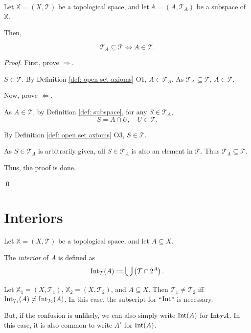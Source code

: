 \begin{proposition}
	Let $\mathbb X = (X, \mathcal T)$ be a topological space, and let $\mathbb A = (A, \mathcal T_A)$ be a subspace of $\mathbb X$.
	
	Then,
	
	$$
	\mathcal T_A \subseteq \mathcal T \iff A \in \mathcal T.
	$$
	
	\begin{proof}
		First, prove $\Rightarrow$.
		
		$S \in \mathcal T$. By Definition \ref{def: open set axioms} O1, $A \in \mathcal T_A$. As $\mathcal T_A \subseteq \mathcal T$, $A \in \mathcal T$.
		
		\qedlm
	
		Now, prove $\Leftarrow$.
		
		As $A \in \mathcal T$, by Definition \ref{def: subspace}, for any $S \in \mathcal T_A$,
		$$
		S = A \cap U, \quad U \in \mathcal T.
		$$
		
		By Definition \ref{def: open set axioms} O3, $S \in \mathcal T$.
		
		As $S \in \mathcal T_A$ is arbitrarily given, all $S \in \mathcal T_A$ is also an element in $\mathcal T$. Thus $\mathcal T_A \subseteq \mathcal T$.
		
		\qedlm
		
		Thus, the proof is done.
		
		\qed
		
	\end{proof}
\end{proposition}


\section{Interiors}


\begin{definition}
	\label{def: interior}
	Let $\mathbb X = (X, \mathcal T)$ be a topological space, and let $A \subseteq X$.
	
	The \textit{interior} of $A$ is defined as
	$$
	\mathrm{Int}_{\mathcal T}(A) := \bigcup \left(\mathcal T \cap 2^A \right).
	$$
\end{definition}


\begin{note}
	Let $\mathbb X_1 = (X, \mathcal T_1)$, $\mathbb X_2 = (X, \mathcal T_2)$, and $A \subseteq X$. Then $\mathcal T_1 \ne \mathcal T_2$ iff $\mathrm{Int}_{\mathcal T_1}(A) \ne \mathrm{Int}_{\mathcal T_2}(A)$. In this case, the subscript for ``$\mathrm{Int}$'' is necessary.
	
	But, if the confusion is unlikely, we can also simply write $\mathrm{Int} (A)$ for $\mathrm{Int}_\mathcal T A$. In this case, it is also common to write $A^\circ$ for $\mathrm{Int}(A)$.
\end{note}



